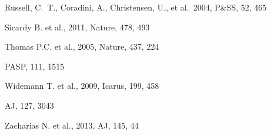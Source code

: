 \documentclass[useAMS,usenatbib]{mn2e}
\begin{document}
\begin{thebibliography}{99}

 Russell, C.~T., Coradini, A., Christensen, U., et al.\ 2004, P\&SS, 52, 465 


 Sicardy B. et al., 2011,
Nature, 478, 493

 Thomas P.C. et al., 2005,
Nature, 437, 224

PASP, 111, 1515

 Widemann T. et al., 2009,
Icarus, 199, 458

AJ, 127, 3043

 Zacharias N. et al., 2013,
AJ, 145, 44



\end{thebibliography}




\label{lastpage}
\end{document}
